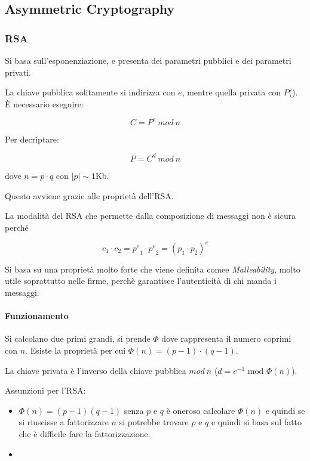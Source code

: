 \subsection{Asymmetric Cryptography}

\subsubsection{RSA}

Si basa sull'esponenziazione, e presenta dei parametri pubblici e dei parametri 
privati.


La chiave pubblica solitamente si indirizza con $e$, mentre quella privata con 
$P$(). È necessario eseguire:

\[ C = P^e\ mod\ n \]

Per decriptare:

\[ P = C^d\ mod\ n \]

dove $n = p \cdot q$ con $|p| \sim 1$Kb.

Questo avviene grazie alle proprietà dell'RSA.

La modalità del RSA che permette dalla composizione di messaggi non è sicura 
perché

\[ c_1 \cdot c_2 = {p^e}_1 \cdot {p^e}_2 = (p_1 \cdot p_2)^e\]


Si basa su una proprietà molto forte che viene definita comee 
\textit{Malleability}, molto utile soprattutto nelle firme, perchè garantisce 
l'autenticità di chi manda i messaggi.


\paragraph{Funzionamento}

Si calcolano due primi grandi, si prende $\Phi$ dove rappresenta il numero 
coprimi con $n$.
Esiste la proprietà per cui $\Phi(n) = (p-1) \cdot (q-1)$.

La chiave privata è l'inverso della chiave pubblica $mod\ n$ ($d = e^{-1}  
\text{ mod } \Phi(n)$).

Assunzioni per l'RSA:
\begin{itemize}
	\item {} $\Phi(n) = (p-1)(q-1)$ senza $p$ e $q$ è 
oneroso calcolare $\Phi(n)$ e quindi se si riuscisse a fattorizzare $n$ si 
potrebbe trovare $p$ e $q$ e quindi si basa sul fatto che è difficile fare la 
fattorizzazione.
    \item {}
\end{itemize}


